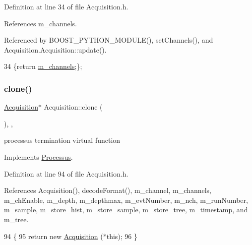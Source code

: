 Definition at line 34 of file Acquisition.\+h.



References m\+\_\+channels.



Referenced by B\+O\+O\+S\+T\+\_\+\+P\+Y\+T\+H\+O\+N\+\_\+\+M\+O\+D\+U\+L\+E(), set\+Channels(), and Acquisition.\+Acquisition\+::update().


\begin{DoxyCode}
34 \{\textcolor{keywordflow}{return} \hyperlink{classAcquisition_aedc8b29f322ef00540797fbd0d5112d1}{m\_channels};\};
\end{DoxyCode}
\mbox{\label{classAcquisition_a4b1b690ef27f20b3e1ad9383f2f57628}} 
\subsubsection{\texorpdfstring{clone()}{clone()}\hspace{0.1cm}{\footnotesize\ttfamily [1/2]}}
{\footnotesize\ttfamily \hyperlink{classAcquisition_1_1Acquisition}{Acquisition}$\ast$ Acquisition\+::clone (\begin{DoxyParamCaption}{ }\end{DoxyParamCaption})\hspace{0.3cm}{\ttfamily [inline]}, {\ttfamily [protected]}, {\ttfamily [virtual]}}

processus termination virtual function 

Implements \hyperlink{classProcessus_aca8856f6d6d7b7e1fe941f298dcbb502}{Processus}.



Definition at line 94 of file Acquisition.\+h.



References Acquisition(), decode\+Format(), m\+\_\+channel, m\+\_\+channels, m\+\_\+ch\+Enable, m\+\_\+depth, m\+\_\+depthmax, m\+\_\+evt\+Number, m\+\_\+nch, m\+\_\+run\+Number, m\+\_\+sample, m\+\_\+store\+\_\+hist, m\+\_\+store\+\_\+sample, m\+\_\+store\+\_\+tree, m\+\_\+timestamp, and m\+\_\+tree.


\begin{DoxyCode}
94                       \{
95     \textcolor{keywordflow}{return} \textcolor{keyword}{new} \hyperlink{classAcquisition_aa7d3138495a4a8888c21b33f4d657732}{Acquisition} (*\textcolor{keyword}{this});
96   \}
\end{DoxyCode}
\mbox{\label{classAcquisition_a4b1b690ef27f20b3e1ad9383f2f57628}} 
